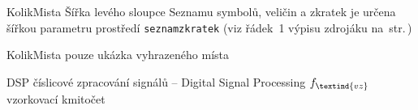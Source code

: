 \begin{seznamzkratek}{KolikMista}
		{Šířka levého sloupce Seznamu symbolů, veličin a zkratek}								%
		{je určena šířkou parametru prostředí \texttt{seznamzkratek} (viz řádek~1 výpisu zdrojáku na~str.\,\pageref{lst:zkratky})}

		{KolikMista}
		{pouze ukázka vyhrazeného místa}

		{DSP}								%
		{číslicové zpracování signálů -- Digital Signal Processing}
		{\ensuremath{f_\textind{vz}}} %
		{vzorkovací kmitočet}					%

\end{seznamzkratek}
